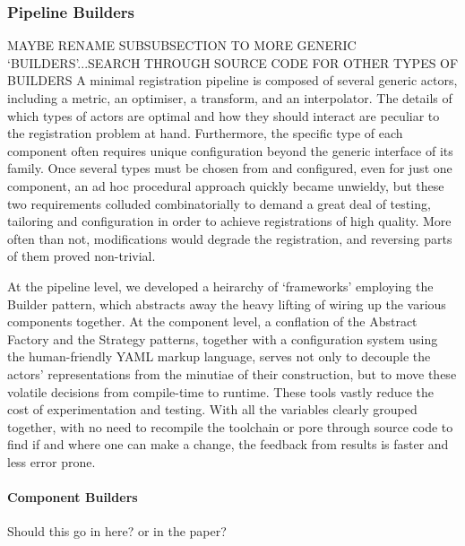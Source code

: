     \subsubsection{Pipeline Builders} %
    \label{ssub:pipeline_builders}
      MAYBE RENAME SUBSUBSECTION TO MORE GENERIC `BUILDERS'...SEARCH THROUGH SOURCE CODE FOR OTHER TYPES OF BUILDERS
          A minimal registration pipeline is composed of several generic actors, including a metric, an optimiser, a transform, and an interpolator. The details of which types of actors are optimal and how they should interact are peculiar to the registration problem at hand. Furthermore, the specific type of each component often requires unique configuration beyond the generic interface of its family. Once several types must be chosen from and configured, even for just one component, an ad hoc procedural approach quickly became unwieldy, but these two requirements colluded combinatorially to demand a great deal of testing, tailoring and configuration in order to achieve registrations of high quality. More often than not, modifications would degrade the registration, and reversing parts of them proved non-trivial.

          At the pipeline level, we developed a heirarchy of `frameworks' employing the Builder pattern, which abstracts away the heavy lifting of wiring up the various components together.  At the component level, a conflation of the Abstract Factory and the Strategy patterns, together with a configuration system using the human-friendly YAML markup language, serves not only to decouple the actors' representations from the minutiae of their construction, but to move these volatile decisions from compile-time to runtime. These tools vastly reduce the cost of experimentation and testing. With all the variables clearly grouped together, with no need to recompile the toolchain or pore through source code to find if and where one can make a change, the feedback from results is faster and less error prone.

      
        \paragraph{Component Builders}
        Should this go in here? or in the paper?

